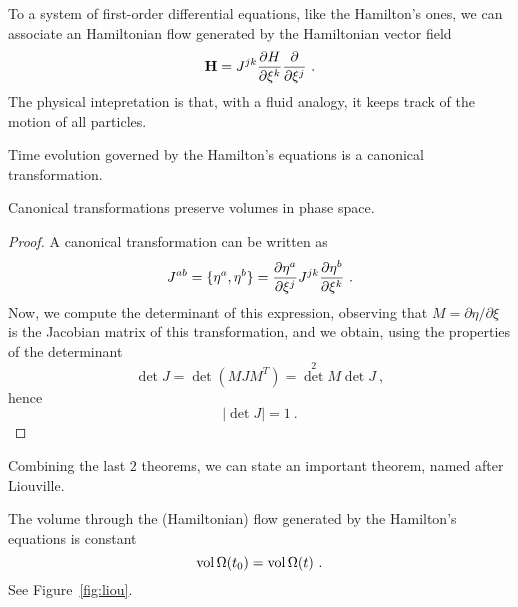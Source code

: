    To a system of first-order differential equations, like the Hamilton's ones, we can associate an Hamiltonian flow generated by the Hamiltonian vector field
    \begin{equation*}
        \mathbf H = J^{jk} \frac{\partial H}{\partial\xi^k} \frac{\partial}{\partial\xi^j} ~.
    \end{equation*}
    The physical intepretation is that, with a fluid analogy, it keeps track of the motion of all particles.
    \begin{theorem}
        Time evolution governed by the Hamilton's equations is a canonical transformation.
    \end{theorem}
    \begin{theorem}
        Canonical transformations preserve volumes in phase space.
    \end{theorem}
    \begin{proof}
        A canonical transformation can be written as 
        \begin{equation*}
            J^{ab} = \{\eta^a, \eta^b\} = \frac{\partial\eta^a}{\partial\xi^j} J^{jk} \frac{\partial\eta^b}{\partial\xi^k} ~.
        \end{equation*}
        Now, we compute the determinant of this expression, observing that $M = \partial \eta / \partial \xi$ is the Jacobian matrix of this transformation, and we obtain, using the properties of the determinant
        \begin{equation*}
            \det J = \det (M J M^T) = {\det}^2 M \det J ~,
        \end{equation*}
        hence 
        \begin{equation*}
            |\det J| = 1 ~.
        \end{equation*}
    \end{proof}
    Combining the last $2$ theorems, we can state an important theorem, named after Liouville. 
    \begin{theorem}[Liouville]
        The volume through the (Hamiltonian) flow generated by the Hamilton's equations is constant
        \begin{equation*}
            \operatorname{vol} \Omega(t_0) = \operatorname{vol} \Omega(t) ~.
        \end{equation*}
        See Figure~\ref{fig:liou}.
    \end{theorem}
